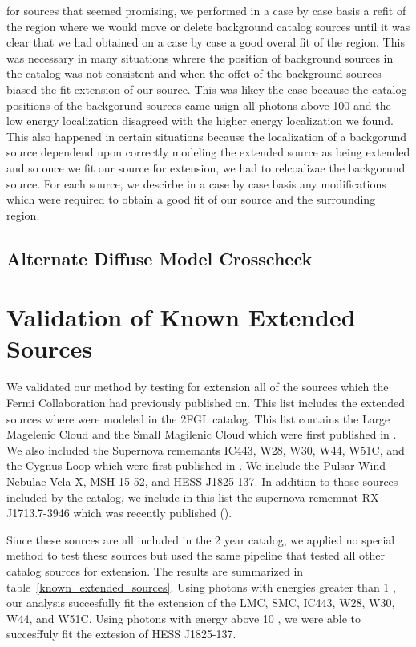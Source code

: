 \documentclass[preprint]{aastex}
\newcommand{\mev}{\text{MeV}\xspace}
\newcommand{\gev}{\text{GeV}\xspace}
\begin{document}
for sources that seemed promising, we performed in a case
by case basis a refit of the region where we would move or delete
background catalog sources until it was clear that we had obtained on
a case by case a good overal fit of the region. This was necessary in
many situations whrere the position of background sources in the catalog
was not consistent and when the offet of the background sources biased
the fit extension of our source. This was likey the case because the
catalog positions of the backgorund sources came usign all photons above
100 \mev and the low energy localization disagreed with the higher energy
localization we found. This also happened in certain situations because
the localization of a backgorund source dependend upon correctly modeling
the extended source as being extended and so once we fit our source for
extension, we had to relcoalizae the backgorund source.  For each source,
we descirbe in a case by case basis any modifications which were required
to obtain a good fit of our source and the surrounding region.

\subsection{Alternate Diffuse Model Crosscheck}
\label{alt_diff_model_description}


\section{Validation of Known Extended Sources}
\label{validate_known}

We validated our method by testing for extension all of the sources
which the Fermi Collaboration had previously published on.  
This list includes the extended sources where were modeled
in the 2FGL catalog\cite{second_cat}.
This list contains the Large Magelenic Cloud and the Small Magilenic Cloud
which were first published in \cite{LMC,SMC}.
We also included the Supernova rememants IC443, W28, W30,
W44, W51C, and the Cygnus Loop which were 
first published in \cite{ic443,w28,w30,w44,w51c,cygnus_loop}.
We include the Pulsar Wind Nebulae Vela X, MSH 15-52, and 
HESS J1825-137\cite{velax,msh1552,fermi_hess_j1825}.
In addition to those sources included by the catalog, we include in
this list the supernova rememnat RX J1713.7-3946 which was recently
published (\cite{RXJ1713}).

Since these sources are all included in the 2 year catalog,
we applied no special method to test these sources but used the same
pipeline that tested all other catalog sources for extension.  The results
are summarized in table~\ref{known_extended_sources}.  
Using photons with
energies greater than 1 \gev, our analysis succesfully fit the extension
of the LMC, SMC, IC443, W28, W30, W44, and W51C.  Using photons with 
energy above 10
\gev, we were able to succesffuly fit the extesion of HESS J1825-137.
\end{document}
